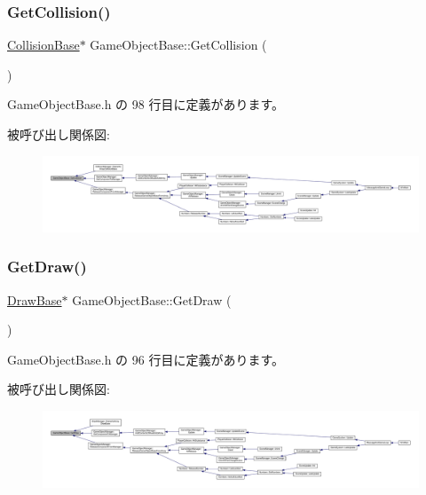 \subsubsection{\texorpdfstring{Get\+Collision()}{GetCollision()}}
{\footnotesize\ttfamily \mbox{\hyperlink{class_collision_base}{Collision\+Base}}$\ast$ Game\+Object\+Base\+::\+Get\+Collision (\begin{DoxyParamCaption}{ }\end{DoxyParamCaption})\hspace{0.3cm}{\ttfamily [inline]}}



 Game\+Object\+Base.\+h の 98 行目に定義があります。

被呼び出し関係図\+:
\nopagebreak
\begin{figure}[H]
\begin{center}
\leavevmode
\includegraphics[width=350pt]{class_game_object_base_a8158138ea811db49445845d8aaacaf3a_icgraph}
\end{center}
\end{figure}
\mbox{\label{class_game_object_base_acb893b1827cb7fbb27f0caf6a8e0fb88}} 
\subsubsection{\texorpdfstring{Get\+Draw()}{GetDraw()}}
{\footnotesize\ttfamily \mbox{\hyperlink{class_draw_base}{Draw\+Base}}$\ast$ Game\+Object\+Base\+::\+Get\+Draw (\begin{DoxyParamCaption}{ }\end{DoxyParamCaption})\hspace{0.3cm}{\ttfamily [inline]}}



 Game\+Object\+Base.\+h の 96 行目に定義があります。

被呼び出し関係図\+:
\nopagebreak
\begin{figure}[H]
\begin{center}
\leavevmode
\includegraphics[width=350pt]{class_game_object_base_acb893b1827cb7fbb27f0caf6a8e0fb88_icgraph}
\end{center}
\end{figure}
\mbox{\label{class_game_object_base_a853cdb5dbb2edf28e45e49540f85e554}} 
